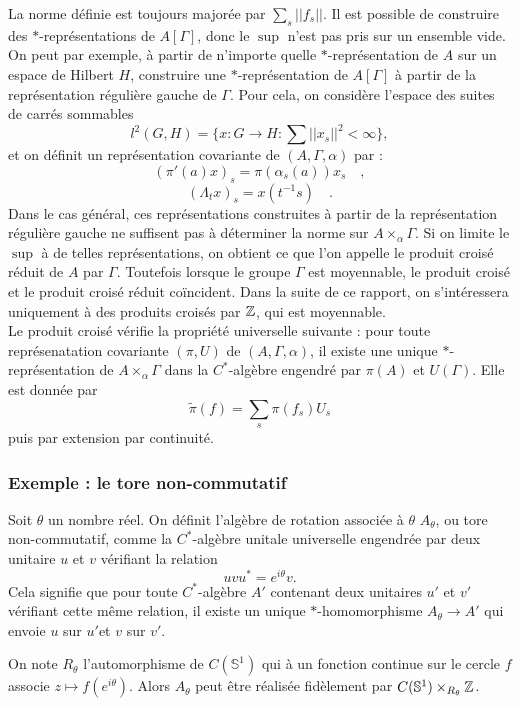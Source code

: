 La norme définie est toujours majorée par $\sum_s ||f_s||$. Il est possible de construire des $*$-représentations de $A[\Gamma]$, donc le $\sup$ n'est pas pris sur un ensemble vide. On peut par exemple, à partir de n'importe quelle $*$-représentation de $A$ sur un espace de Hilbert $H$, construire une $*$-représentation de $A[\Gamma]$ à partir de la représentation régulière gauche de $\Gamma$. Pour cela, on considère l'espace des suites de carrés sommables 
\[l^2(G,H)=\{x:G\rightarrow H : \sum||x_s||^2<\infty\} , \]
et on définit un représentation covariante de $(A,\Gamma,\alpha)$ par :
\[(\pi'(a)x)_s=\pi(\alpha_s(a))x_s\quad,\]
\[(\Lambda_t x)_s=x(t^{-1}s)\quad. \]
Dans le cas général, ces représentations construites à partir de la représentation régulière gauche ne suffisent pas à déterminer la norme sur $A\times_\alpha \Gamma$. Si on limite le $\sup$ à de telles représentations, on obtient ce que l'on appelle le produit croisé réduit de $A$ par $\Gamma$. Toutefois lorsque le groupe $\Gamma$ est moyennable, le produit croisé et le produit croisé réduit coïncident.
Dans la suite de ce rapport, on s'intéressera uniquement à des produits croisés par $\mathbb Z$, qui est moyennable. \\

Le produit croisé vérifie la propriété universelle suivante : pour toute représenatation covariante $(\pi,U)$ de $(A,\Gamma,\alpha)$, il existe une unique $*$-représentation de $A\times_\alpha \Gamma$ dans la $C^*$-algèbre engendré par $\pi(A)$ et $U(\Gamma)$. Elle est donnée par 
\[\tilde\pi(f)=\sum_s \pi(f_s)U_s\]
puis par extension par continuité.

\subsubsection{Exemple : le tore non-commutatif}

\begin{definition}
Soit $\theta$ un nombre réel. On définit l'algèbre de rotation associée à $\theta$ $A_\theta$, ou tore non-commutatif, comme la $C^*$-algèbre unitale universelle engendrée par deux unitaire $u$ et $v$ vérifiant la relation 
\[uvu^*= e^{i\theta}v.\]
Cela signifie que pour toute $C^*$-algèbre $A'$ contenant deux unitaires $u'$ et $v'$ vérifiant cette même relation, il existe un unique $*$-homomorphisme $A_\theta\rightarrow A'$ qui envoie $u$ sur $u'$et $v$ sur $v'$. 
\end{definition}

On note $R_\theta$ l'automorphisme de $C(\mathbb S^1)$ qui à un fonction continue sur le cercle $f$ associe $z\mapsto f(e^{i\theta})$. Alors $A_\theta$ peut être réalisée fidèlement par $C(\mathbb S^1)\times_{R_\theta} \mathbb Z$.\\

